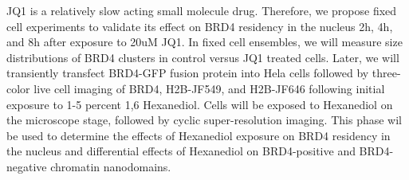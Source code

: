 \documentclass{ucetd}
\begin{document}
JQ1 is a relatively slow acting small molecule drug. Therefore, we propose fixed cell experiments to validate its effect on BRD4 residency in the nucleus 2h, 4h, and 8h after exposure to 20uM JQ1. In fixed cell ensembles, we will measure size distributions of BRD4 clusters in control versus JQ1 treated cells. Later, we will transiently transfect BRD4-GFP fusion protein into Hela cells followed by three-color live cell imaging of BRD4, H2B-JF549, and H2B-JF646 following initial exposure to 1-5 percent 1,6 Hexanediol. Cells will be exposed to Hexanediol on the microscope stage, followed by cyclic super-resolution imaging. This phase wil be used to determine the effects of Hexanediol exposure on BRD4 residency in the nucleus and differential effects of Hexanediol on BRD4-positive and BRD4-negative chromatin nanodomains. 
\end{document}
